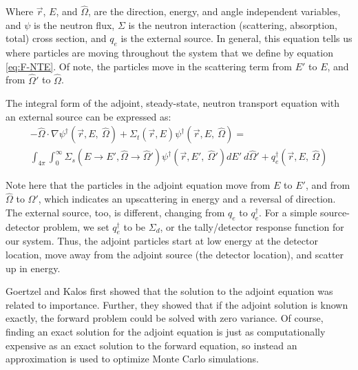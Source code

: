 Where $\vec { r }$, $E$, and $\hat\Omega$, are the direction, energy, and angle
independent variables, and $\psi$ is the neutron flux, $\Sigma$ is the neutron
interaction (scattering, absorption, total) cross section, and $q_{e}$ is the
external source. In general, this equation tells us where particles are moving
throughout the system that we define by equation \ref{eq:F-NTE}. Of note, the
particles move in the scattering term from $E'$ to $E$, and from $\hat\Omega'$
to $\hat\Omega$.

The integral form of the adjoint, steady-state, neutron transport equation with
an external source can be expressed as:
\begin{multline}
-\hat\Omega \cdot \nabla \psi^{\dagger}
        (\vec {r} ,E,\:\hat\Omega)+\Sigma _{ t }
        (\vec{r},E)\psi^{\dagger}  (\vec { r } ,E,\:\hat\Omega)
       = \\
        \int _{ 4\pi  } \int _{ 0 }^{ \infty  } \Sigma _{ s }(E\rightarrow E',
        \hat\Omega\rightarrow\hat\Omega')\psi^{\dagger}  (\vec { r } ,E',\:
        \hat\Omega')dE' \:d\hat\Omega' + q_{e}^\dagger(\vec { r } ,E, \:\hat\Omega)
\label{eq:A-NTE}
\end{multline}


Note here that the particles in the adjoint equation move from $E$ to $E'$, and
from $\hat\Omega$ to $\hat\Omega'$, which indicates an upscattering in energy
and a reversal of direction. The external source, too, is different, changing
from $q_{e}$ to $q_{e}^\dagger$. For a simple source-detector problem, we set
$q_{e}^\dagger$ to be $\Sigma _{ d }$, or the tally/detector response function
for our system. Thus, the adjoint particles start at low energy at the detector
location, move away from the adjoint source (the detector location), and scatter
up in energy.

Goertzel \cite{goertzel_monte_1958} and Kalos \cite{kalos_importance_1963} first
showed that the solution to the adjoint equation was related to importance.
Further, they showed that if the adjoint solution is known exactly, the forward
problem could be solved with zero variance. Of course, finding an exact solution
for the adjoint equation is just as computationally expensive as an exact
solution to the forward equation, so instead an approximation is used to
optimize Monte Carlo simulations.

